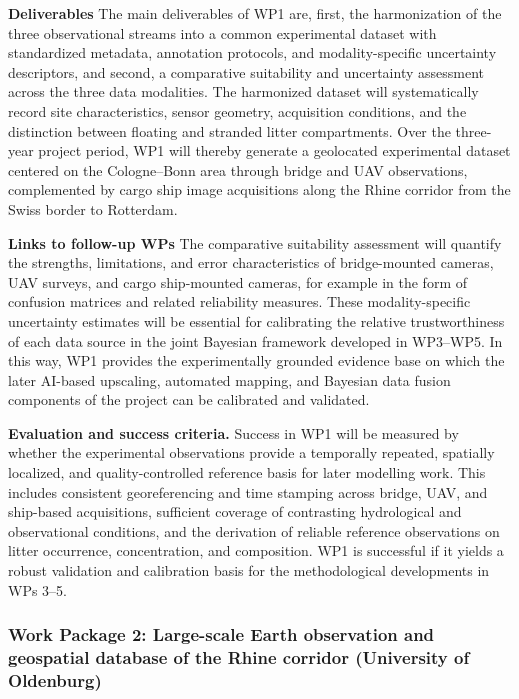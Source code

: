 \documentclass{scrartcl}
\begin{document}
\textbf{Deliverables} The main deliverables of WP1 are, first, the harmonization of the three observational streams into a common experimental dataset with standardized metadata, annotation protocols, and modality-specific uncertainty descriptors, and second, a comparative suitability and uncertainty assessment across the three data modalities. The harmonized dataset will systematically record site characteristics, sensor geometry, acquisition conditions, and the distinction between floating and stranded litter compartments. Over the three-year project period, WP1 will thereby generate a geolocated experimental dataset centered on the Cologne--Bonn area through bridge and UAV observations, complemented by cargo ship image acquisitions along the Rhine corridor from the Swiss border to Rotterdam.

\textbf{Links to follow-up WPs} The comparative suitability assessment will quantify the strengths, limitations, and error characteristics of bridge-mounted cameras, UAV surveys, and cargo ship-mounted cameras, for example in the form of confusion matrices and related reliability measures. These modality-specific uncertainty estimates will be essential for calibrating the relative trustworthiness of each data source in the joint Bayesian framework developed in WP3--WP5. In this way, WP1 provides the experimentally grounded evidence base on which the later AI-based upscaling, automated mapping, and Bayesian data fusion components of the project can be calibrated and validated.

\textbf{Evaluation and success criteria.} Success in WP1 will be measured by whether the experimental observations provide a temporally repeated, spatially localized, and quality-controlled reference basis for later modelling work. This includes consistent georeferencing and time stamping across bridge, UAV, and ship-based acquisitions, sufficient coverage of contrasting hydrological and observational conditions, and the derivation of reliable reference observations on litter occurrence, concentration, and composition. WP1 is successful if it yields a robust validation and calibration basis for the methodological developments in WPs 3--5.


\subsubsection{Work Package 2: Large-scale Earth observation and geospatial database of the Rhine corridor (University of Oldenburg)}
\end{document}
